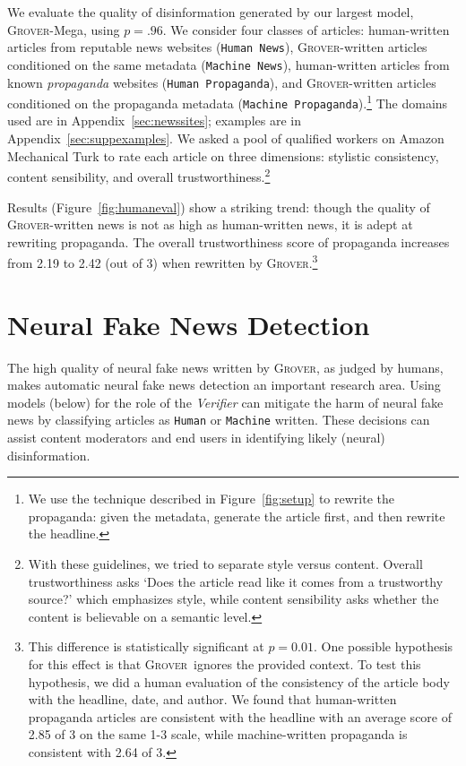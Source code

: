 \documentclass{article}
\newcommand{\modelname}{{\textsc{Grover}}}
\begin{document}
We evaluate the quality of disinformation generated by our largest model, \modelname-Mega, using $p{=}.96$. We consider four classes of articles: 
human-written articles from reputable news websites ({\tt\small Human News}), 
\modelname-written articles conditioned on the same metadata ({\tt\small Machine News}),
human-written articles from known \emph{propaganda} websites ({\tt\small Human Propaganda}),
and \modelname-written articles conditioned on the propaganda metadata ({\tt\small Machine Propaganda}).\footnote{We use the technique described in Figure~\ref{fig:setup} to rewrite the propaganda: given the metadata, generate the article first, and then rewrite the headline.} The domains used are in Appendix~\ref{sec:newssites}; examples are in Appendix~\ref{sec:suppexamples}. We asked a pool of qualified workers on Amazon Mechanical Turk to rate each article on three dimensions: stylistic consistency, content sensibility, and overall trustworthiness.\footnote{With these guidelines, we tried to separate style versus content. Overall trustworthiness asks `Does the article read like it comes from a trustworthy source?' which emphasizes style, while content sensibility asks whether the content is believable on a semantic level.}

Results (Figure~\ref{fig:humaneval}) show a striking trend: though the quality of \modelname-written news is not as high as human-written news, it is adept at rewriting propaganda. The overall trustworthiness score of propaganda increases from 2.19 to 2.42 (out of 3) when rewritten by \modelname.\footnote{This difference is statistically significant at $p=0.01$. One possible hypothesis for this effect is that \modelname~ignores the provided context. To test this hypothesis, we did a human evaluation of the consistency of the article body with the headline, date, and author. We found that human-written propaganda articles are consistent with the headline with an average score of 2.85 of 3 on the same 1-3 scale, while machine-written propaganda is consistent with 2.64 of 3.}
 
\section{Neural Fake News Detection}
\label{sec:detection}
The high quality of neural fake news written by \modelname, as judged by humans, makes automatic neural fake news detection an important research area. Using models (below) for the role of the \emph{Verifier} can mitigate the harm of neural fake news by classifying articles as {\tt\small Human} or {\tt\small Machine} written. These decisions can assist content moderators and end users in identifying likely (neural) disinformation. 
\end{document}
